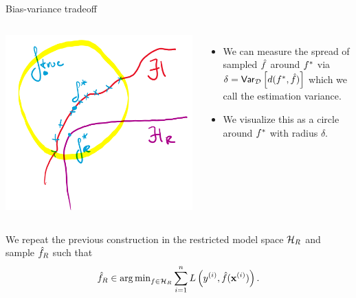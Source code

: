 \documentclass[11pt,compress,t,notes=noshow, xcolor=table]{beamer}
\begin{document}
\begin{vbframe}{Bias-variance tradeoff}
\begin{columns}[onlytextwidth,T]
  \includegraphics[width=1.0\textwidth]{slides/regularization/figure_man/to_replace_estimation_variance.png}

      \lz 
      \begin{itemize}
          \item We can measure the spread of sampled $\hat{f}$ around $f^{\ast}$ via $\delta = \mathsf{Var}_{\mathcal{D}}\left[d(f^{\ast}, \hat{f})\right]$ which we call the estimation variance.
          \item We visualize this as a circle around $f^{\ast}$ with radius $\delta.$
      \end{itemize}
    \end{columns}

\framebreak

We repeat the previous construction in the restricted model space $\mathcal{H}_R$ and sample $\hat{f}_R$ such that 
$$\hat{f}_R \in \operatorname{arg\,min}_{f\in\mathcal{H}_R} \sum\limits_{i=1}^n L\left(y^{(i)}, \hat{f} (\mathbf{x}^{(i)})\right).$$
\begin{columns}[onlytextwidth,T]


\end{columns}
\end{vbframe}
\end{document}
